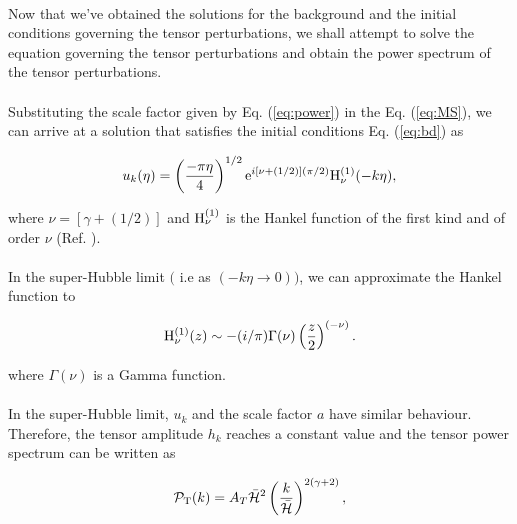 \documentclass[12pt,a4paper,oneside]{book}
\begin{document}
\paragraph*{} Now that we've obtained the solutions for the background and the initial conditions 
governing the tensor perturbations, we shall attempt to solve the equation governing the tensor perturbations 
and obtain the power spectrum of the tensor perturbations.	 

\paragraph*{} Substituting the scale factor given by Eq. (\ref{eq:power}) in the Eq. (\ref{eq:MS}), we can arrive at a 
solution that satisfies the initial conditions Eq. (\ref{eq:bd}) as 

\begin{equation}
u_k(\eta) = \left(\frac{-\pi\eta}{4}\right)^{1/2}{\rm e}^{i[\nu+(1/2)](\pi/2)}{\rm H}_{\nu}^{(1)}(-k\eta),
\end{equation}

\noindent where $\nu = [\gamma + (1/2)]$ and ${\rm H}_{\nu}^{(1)}$ is the 
Hankel function of the first kind and of order $\nu$ (Ref. \cite{Ab}).

\paragraph*{} In the super-Hubble limit $($ i.e as $(-k\eta \rightarrow 0))$, we can approximate the Hankel function to

\begin{equation}
{\rm H}_{\nu}^{(1)}(z) \sim -(i/\pi)\Gamma(\nu)\left(\frac{z}{2}\right)^{(-\nu)}.
\end{equation}

\noindent where $\Gamma(\nu)$ is a Gamma function.

\paragraph*{} In the super-Hubble limit, $u_k$ and the scale factor $a$ have similar behaviour. Therefore, 
the tensor amplitude $h_k$ reaches a constant value and the tensor power spectrum can be written as

\begin{equation}
\mathcal{P}_{\rm T}(k) = A_T\bar{\mathcal{H}}^2\left(\frac{k}{\mathcal{\bar{H}}}\right)^{2(\gamma+2)},
\end{equation}
\end{document}

